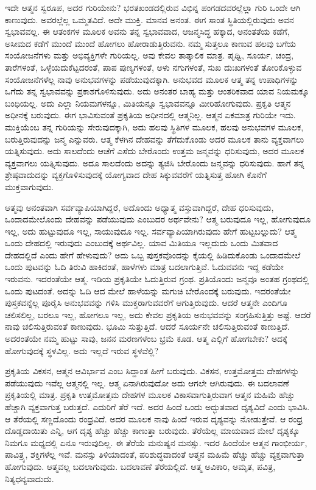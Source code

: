 ಇದೇ ಆತ್ಮನ ಸ್ವರೂಪ, ಅದರ ಗುರಿಯೇನು? ಭರತಖಂಡದಲ್ಲಿರುವ ವಿಭಿನ್ನ ಪಂಗಡದವರಲ್ಲೆಲ್ಲಾ ಗುರಿ ಒಂದೇ ಆಗಿ ಕಾಣುವುದು. ಅವರಲ್ಲೆಲ್ಲ ಒಮ್ಮತವಿದೆ. ಅದೇ ಮುಕ್ತಿ. ಮಾನವ ಅನಂತ. ಈಗ ಸಾಂತ ಸ್ಥಿತಿಯಲ್ಲಿರುವುದು ಅವನ ಸ್ವಭಾವವಲ್ಲ. ಈ ಆತಂಕಗಳ ಮೂಲಕ ಅವನು ತನ್ನ ಸ್ವಭಾವವಾದ, ಆಜನ್ಮಸಿದ್ಧ ಹಕ್ಕಾದ, ಅನಂತತೆಯ ಕಡೆಗೆ, ಅಸೀಮದ ಕಡೆಗೆ ಮುಂದೆ ಮುಂದೆ ಹೋಗಲು ಹೋರಾಡುತ್ತಿರುವನು. ನಮ್ಮ ಸುತ್ತಲೂ ಕಾಣುವ ಹಲವು ಬಗೆಯ ಸಂಯೋಜನೆಗಳು ಮತ್ತು ಅಭಿವ್ಯಕ್ತಿಗಳೇ ಗುರಿಯಲ್ಲ. ಅವು ಕೇವಲ ತಾತ್ಕಾಲಿಕ ಮಾತ್ರ. ಪೃಥ್ವಿ, ಸೂರ್ಯ, ಚಂದ್ರ, ತಾರೆಗಳಂತೆ, ಒಳ್ಳೆಯದು\break ಕೆಟ್ಟದರಂತೆ, ಪಾಪ ಪುಣ್ಯಗಳಂತೆ, ಅಳು ನಗುಗಳಂತೆ, ಸುಖ ದುಃಖಗಳಂತೆ ತೋರಿಕೊಳ್ಳುವ ಸಂಯೋಜನೆಗಳೆಲ್ಲ ನಾವು ಅನುಭವಗಳನ್ನು ಪಡೆಯುವುದಕ್ಕಾಗಿ. ಅನುಭವದ ಮೂಲಕ ಆತ್ಮ ತನ್ನ ಉಪಾಧಿಗಳನ್ನು ಒಗೆದು ತನ್ನ ಸ್ವಭಾವವನ್ನು ಪ್ರಕಾಶಗೊಳಿಸುವುದು. ಅದು ಅನಂತರ ಬಾಹ್ಯ ಮತ್ತು ಆಂತರಿಕವಾದ ಯಾವ ನಿಯಮಕ್ಕೂ ಬಂಧಿಯಲ್ಲ. ಅದು ಎಲ್ಲಾ ನಿಯಮಗಳನ್ನೂ, ಮಿತಿಯನ್ನೂ ಸ್ವಭಾವವನ್ನೂ ಮೀರಿಹೋಗುವುದು. ಪ್ರಕೃತಿ ಆತ್ಮನ ಅಧೀನಕ್ಕೆ ಬರುವುದು. ಈಗ ಭಾವಿಸುವಂತೆ ಪ್ರಕೃತಿಯ ಅಧೀನದಲ್ಲಿ ಆತ್ಮನಿಲ್ಲ. ಆತ್ಮನ ಏಕಮಾತ್ರ ಗುರಿಯೇ ಇದು. ಮುಕ್ತಿಯೆಂಬ ತನ್ನ ಗುರಿಯನ್ನು ಸೇರುವುದಕ್ಕಾಗಿ, ಅದು ಹಲವು ಸ್ಥಿತಿಗಳ ಮೂಲಕ, ಹಲವು ಅನುಭವಗಳ ಮೂಲಕ, ಬರುತ್ತಿರುವುದನ್ನು ಜನ್ಮ ಎನ್ನುವರು. ಆತ್ಮ ಕೆಳಗಿನ ದೇಹವನ್ನು ತೆಗೆದುಕೊಂಡು ಅದರ ಮೂಲಕ ತಾನು ವ್ಯಕ್ತವಾಗಲು ಯತ್ನಿಸುವುದು. ಅದು ಸಾಲದೆಂದು ಆಚೆಗೆ ಎಸೆದು ಬೇರೊಂದು ಉತ್ತಮ ಜನ್ಮವನ್ನು ಧರಿಸುವುದು, ಅದರ ಮೂಲಕ ವ್ಯಕ್ತವಾಗಲು ಯತ್ನಿಸುವುದು. ಅದೂ ಸಾಲದೆಂದು ಅದನ್ನು ತ್ಯಜಿಸಿ ಬೇರೊಂದು ಜನ್ಮವನ್ನು ಧರಿಸುವುದು. ಹಾಗೆ ತನ್ನ ಶ್ರೇಷ್ಠವಾದುದನ್ನು ವ್ಯಕ್ತಗೊಳಿಸುವುದಕ್ಕೆ ಯೋಗ್ಯವಾದ ದೇಹ ಸಿಕ್ಕುವವರೆಗೆ ಯತ್ನಿಸುತ್ತ ಹೋಗಿ ಕೊನೆಗೆ ಮುಕ್ತವಾಗುವುದು.

ಆತ್ಮವು ಅನಂತವಾಗಿ ಸರ್ವವ್ಯಾಪಿಯಾಗಿದ್ದರೆ, ಅದೊಂದು ಅಧ್ಯಾತ್ಮ ವಸ್ತುವಾಗಿದ್ದರೆ, ದೇಹ ಧರಿಸುವುದು, ಒಂದಾದಮೇಲೊಂದು ದೇಹವನ್ನು ಪಡೆಯುವುದು ಎಂಬುದರ ಅರ್ಥವೇನು? ಆತ್ಮ ಬರುವುದೂ ಇಲ್ಲ, ಹೋಗುವುದೂ ಇಲ್ಲ, ಅದು ಹುಟ್ಟುವುದೂ ಇಲ್ಲ, ಸಾಯುವುದೂ ಇಲ್ಲ. ಸರ್ವವ್ಯಾಪಿಯಾಗಿರುವುದು ಹೇಗೆ ಹುಟ್ಟಬಲ್ಲುದು? ಆತ್ಮ ಒಂದು ದೇಹದಲ್ಲಿ ಇರುವುದು ಎಂಬುದಕ್ಕೆ ಅರ್ಥವಿಲ್ಲ. ಯಾವ ಮಿತಿಯೂ ಇಲ್ಲದುದು ಒಂದು ಮಿತವಾದ ದೇಹದಲ್ಲಿದೆ ಎಂದು ಹೇಗೆ ಹೇಳುವುದು? ಅದು ಒಬ್ಬ ಪುಸ್ತಕವೊಂದನ್ನು ಕೈಯಲ್ಲಿ ಹಿಡಿದುಕೊಂಡು ಒಂದಾದಮೇಲೆ ಒಂದು ಪುಟವನ್ನು ಓದಿ ತಿರುವಿ ಹಾಕಿದಂತೆ, ಹಾಳೆಗಳು ಮಾತ್ರ ಬದಲಾಗುತ್ತಿವೆ. ಓದುವವನು ಇದ್ದ ಕಡೆಯೇ ಇರುವನು. ಇದರಂತೆಯೇ ಆತ್ಮ. ಇಡಿಯ ಪ್ರಕೃತಿಯೇ ಓದುತ್ತಿರುವ ಗ್ರಂಥ. ಪ್ರತಿಯೊಂದು ಜನ್ಮವೂ ಅಂತಹ ಗ್ರಂಥದಲ್ಲಿ ಒಂದು ಪುಟದಂತೆ. ಅದನ್ನು ಓದಿ ಆದ ಮೇಲೆ ಹಾಳೆಯನ್ನು ಮಗುಚಿ ಬೇರೊಂದಕ್ಕೆ ಬರುವುದು. ಇದರಂತೆಯೇ ಪುಸ್ತಕವನ್ನೆಲ್ಲ ಪೂರೈಸಿ ಅನುಭವವನ್ನು ಗಳಿಸಿ ಮುಕ್ತರಾಗುವವರೆಗೆ ಆಗುತ್ತಿರುವುದು. ಆದರೆ ಆತ್ಮನೇ ಎಂದಿಗೂ ಚಲಿಸಲಿಲ್ಲ, ಬರಲೂ ಇಲ್ಲ, ಹೋಗಲೂ ಇಲ್ಲ, ಅದು ಕೇವಲ ಪ್ರಕೃತಿಯ ಅನುಭವವನ್ನು ಸಂಗ್ರಹಿಸುತ್ತಿತ್ತು ಅಷ್ಟೆ. ಆದರೆ ನಾವು ಚಲಿಸುತ್ತಿರುವಂತೆ ಕಾಣುವುದು. ಭೂಮಿ ಸುತ್ತುತ್ತಿದೆ. ಆದರೆ ಸೂರ್ಯನೇ ಚಲಿಸುತ್ತಿರುವಂತೆ ಕಾಣುತ್ತಿದೆ. ಅದರಂತೆಯೇ ನಮ್ಮ ಹುಟ್ಟು ಸಾವು, ಜನನ ಮರಣಗಳೆಂಬ ಭ್ರಮೆ ಕೂಡ. ಆತ್ಮ ಎಲ್ಲಿಗೆ ಹೋಗಬೇಕು? ಅದಕ್ಕೆ ಹೋಗುವುದಕ್ಕೆ ಸ್ಥಳವಿಲ್ಲ. ಅದು ಇಲ್ಲದೆ ಇರುವ ಸ್ಥಳವೆಲ್ಲಿ?

ಪ್ರಕೃತಿಯ ವಿಕಸನ, ಆತ್ಮನ ಆವಿರ್ಭಾವ ಎಂಬ ಸಿದ್ದಾಂತ ಹೀಗೆ ಬರುವುದು. ವಿಕಸನ, ಉತ್ತಮೋತ್ತಮ ದೇಹಗಳನ್ನು ಪಡೆಯುವುದು ಇವೆಲ್ಲ ಆತ್ಮನಲ್ಲಿ ಇಲ್ಲ. ಆತ್ಮ ಏನಾಗಿರುವುದೋ ಅದು ಆಗಲೇ ಆಗಿರುವುದು. ಈ ಬದಲಾವಣೆ ಪ್ರಕೃತಿಯಲ್ಲಿ ಮಾತ್ರ. ಪ್ರಕೃತಿ ಉತ್ತಮೋತ್ತಮ ದೇಹಗಳ ಮೂಲಕ ವಿಕಾಸವಾಗುತ್ತಿರುವಾಗ ಆತ್ಮನ ಮಹಿಮೆ ಹೆಚ್ಚು ಹೆಚ್ಚಾಗಿ ವ್ಯಕ್ತವಾಗುತ್ತ ಬರುತ್ತದೆ. ಎದುರಿಗೆ ತೆರೆ ಇದೆ. ಅದರ ಹಿಂದೆ ಒಂದು ಅದ್ಭುತವಾದ ದೃಶ್ಯವಿದೆ ಎಂದು ಭಾವಿಸಿ. ಆ ತೆರೆಯಲ್ಲಿ ಸಣ್ಣದೊಂದು ರಂಧ್ರವಿದೆ. ಅದರ ಮೂಲಕ ನಾವು ಹಿಂದೆ ಇರುವ ದೃಶ್ಯವನ್ನು ನೋಡುತ್ತೇವೆ. ಆ ರಂಧ್ರ ದೊಡ್ಡದಾಯಿತು ಎನ್ನಿ, ಆಗ ದೃಶ್ಯ ಹೆಚ್ಚು ಹೆಚ್ಚು ಕಾಣುತ್ತಾ ಬರುವುದು. ತೆರೆಯೆಲ್ಲ ಮಾಯವಾದ ಮೇಲೆ ದೃಶ್ಯಕ್ಕೂ ನಿಮಗೂ ಮಧ್ಯದಲ್ಲಿ ಏನೂ ಇರುವುದಿಲ್ಲ. ಈ ತೆರೆಯೆ ಮನುಷ್ಯನ ಮನಸ್ಸು. ಇದರ ಹಿಂದೆಯೇ ಆತ್ಮನ ಗಾಂಭೀರ್ಯ, ಪಾವಿತ್ರ್ಯ, ಶಕ್ತಿಗಳೆಲ್ಲ ಇವೆ. ಮನಸ್ಸು ತಿಳಿಯಾದಂತೆ, ಪರಿಶುದ್ಧವಾದಂತೆ ಆತ್ಮನ ಮಹಿಮೆ ಹೆಚ್ಚು ಹೆಚ್ಚು ವ್ಯಕ್ತವಾಗುತ್ತಾ ಹೋಗುವುದು. ಆತ್ಮವಲ್ಲ ಬದಲಾಗುವುದು. ಬದಲಾವಣೆ ತೆರೆಯಲ್ಲಿದೆ. ಆತ್ಮ ಅವಿಕಾರಿ, ಅಮೃತ, ಪವಿತ್ರ, ನಿತ್ಯ\break ಧನ್ಯವಾದುದು.

